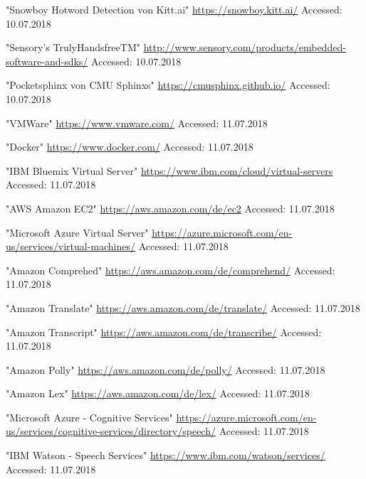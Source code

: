 \documentclass[journal]{IEEEtran}
\begin{document}
\ifCLASSOPTIONcaptionsoff
  \newpage
\fi

\begin{thebibliography}{1}
"Snowboy Hotword Detection von Kitt.ai"
\url{https://snowboy.kitt.ai/}
Accessed: 10.07.2018

"Sensory's TrulyHandsfreeTM"
\url{http://www.sensory.com/products/embedded-software-and-sdks/}
Accessed: 10.07.2018

"Pocketsphinx von CMU Sphinxs"
\url{https://cmusphinx.github.io/}
Accessed: 10.07.2018

"VMWare"
\url{https://www.vmware.com/}
Accessed: 11.07.2018

"Docker"
\url{https://www.docker.com/}
Accessed: 11.07.2018

"IBM Bluemix Virtual Server"
\url{https://www.ibm.com/cloud/virtual-servers}
Accessed: 11.07.2018

"AWS Amazon EC2"
\url{https://aws.amazon.com/de/ec2}
Accessed: 11.07.2018

"Microsoft Azure Virtual Server"
\url{https://azure.microsoft.com/en-us/services/virtual-machines/}
Accessed: 11.07.2018

"Amazon Comprehed"
\url{https://aws.amazon.com/de/comprehend/}
Accessed: 11.07.2018

"Amazon Translate"
\url{https://aws.amazon.com/de/translate/}
Accessed: 11.07.2018

"Amazon Transcript"
\url{https://aws.amazon.com/de/transcribe/}
Accessed: 11.07.2018

"Amazon Polly"
\url{https://aws.amazon.com/de/polly/}
Accessed: 11.07.2018

"Amazon Lex"
\url{https://aws.amazon.com/de/lex/}
Accessed: 11.07.2018

"Microsoft Azure - Cognitive Services"
\url{https://azure.microsoft.com/en-us/services/cognitive-services/directory/speech/}
Accessed: 11.07.2018

"IBM Watson - Speech Services"
\url{https://www.ibm.com/watson/services/}
Accessed: 11.07.2018


\end{thebibliography}
\end{document}
